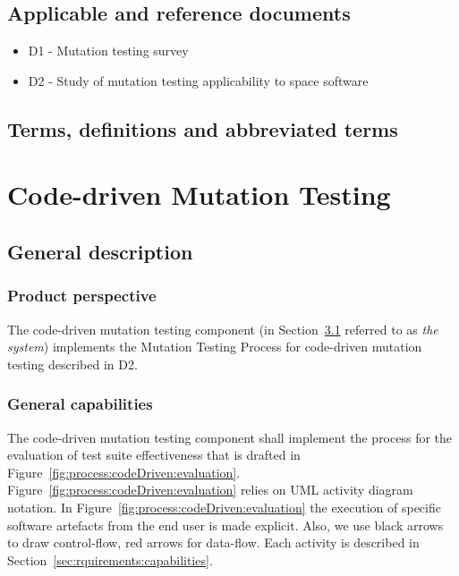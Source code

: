 
\section{Applicable and reference documents}

\begin{itemize}
\item{D1 - Mutation testing survey}
\item{D2 - Study of mutation testing applicability to space software}
\end{itemize}
\clearpage

\section{Terms, definitions and abbreviated terms}

\clearpage


\chapter{Code-driven Mutation Testing}

\section{General description}
\label{codeDriven}



\subsection{Product perspective}

\RQ{} The code-driven mutation testing component (in Section~\ref{codeDriven} referred to as \emph{the system}) implements the Mutation Testing Process for code-driven mutation testing described in D2.

\clearpage
\subsection{General capabilities}

\RQ{} The code-driven mutation testing component shall implement the process for the evaluation of test suite effectiveness that is drafted in Figure~\ref{fig:process:codeDriven:evaluation}. Figure~\ref{fig:process:codeDriven:evaluation} relies on UML activity diagram notation. In Figure~\ref{fig:process:codeDriven:evaluation} the execution of specific software artefacts from the end user is made explicit. Also, we use black arrows to draw control-flow, red arrows for data-flow. Each activity is described in Section~\ref{sec:rquirements:capabilities}.

